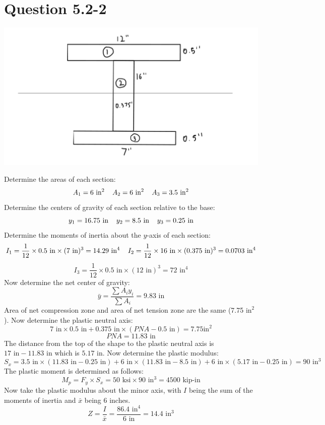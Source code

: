 \documentclass{article}
\begin{document}
\section*{Question 5.2-2}
\begin{center}
\includegraphics*[scale=0.4]{fig1.png}
\end{center}
Determine the areas of each section:
\[A_1 = 6\text{ in}^2\hspace{4mm}A_2=6\text{ in}^2\hspace{4mm}A_3=3.5\text{ in}^2\] 
Determine the centers of gravity of each section relative to the base:
\[y_1 = 16.75\text{ in}\hspace{4mm}y_2=8.5\text{ in}\hspace{4mm}y_3=0.25\text{ in}\] 
Determine the moments of inertia about the $y$-axis of each section: 
\[I_1=\frac{1}{12}\times 0.5\text{ in}\times(7\text{ in})^3=14.29\text{ in}^4\hspace{4mm}I_2=\frac{1}{12}\times 16\text{ in}\times(0.375\text{ in})^3=0.0703\text{ in}^4\] 
\[I_3=\frac{1}{12}\times 0.5\text{ in}\times(12\text{ in})^3=72\text{ in}^4\]
Now determine the net center of gravity: 
\[\bar{y}=\frac{\sum A_iy_i}{\sum A_i}=9.83\text{ in}\]
Area of net compression zone and area of net tension zone are the same (7.75 $\text{in}^2$). Now determine the plastic neutral axis: 
\[7\text{ in}\times 0.5\text{ in}+0.375\text{ in}\times (PNA-0.5\text{ in})=7.75 \text{in}^2\] 
\[PNA=11.83\text{ in}\]
The distance from the top of the shape to the plastic neutral axis is $17 \text{ in}-11.83 \text{ in}$ which is $\boxed{5.17\text{ in}}$. Now determine the plastic modulus: 
\[S_x=3.5\text{ in}\times (11.83\text{ in}-0.25\text{ in})+6\text{ in}\times (11.83\text{ in}-8.5\text{ in})+6\text{ in}\times(5.17\text{ in}-0.25\text{ in})=90\text{ in}^3\] 
The plastic moment is determined as follows: 
\[M_p=F_y\times S_x=50\text{ ksi}\times 90\text{ in}^3=\boxed{4500\text{ kip-in}}\]
Now take the plastic modulus about the minor axis, with $I$ being the sum of the moments of inertia and $\bar{x}$ being 6 inches. 
\[Z=\frac{I}{\bar{x}}=\frac{86.4\text{ in}^4}{6\text{ in}}=\boxed{14.4\text{ in}^3}\] 
\end{document}
